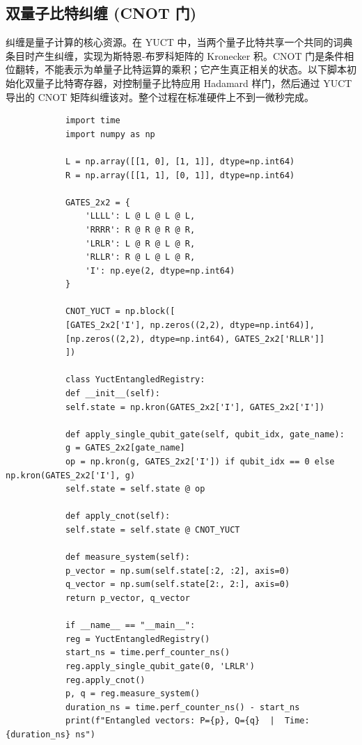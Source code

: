 \documentclass[11pt,a4paper]{article}
\begin{document}
	\subsection{双量子比特纠缠 (CNOT 门)}
	
	纠缠是量子计算的核心资源。在 YUCT 中，当两个量子比特共享一个共同的词典条目时产生纠缠，实现为斯特恩-布罗科矩阵的 Kronecker 积。CNOT 门是条件相位翻转，不能表示为单量子比特运算的乘积；它产生真正相关的状态。以下脚本初始化双量子比特寄存器，对控制量子比特应用 Hadamard 样门，然后通过 YUCT 导出的 CNOT 矩阵纠缠该对。整个过程在标准硬件上不到一微秒完成。
	
	\begin{tcolorbox}[title=YUCT CNOT 纠缠模拟器 (Python), breakable]
		\begin{lstlisting}
			import time
			import numpy as np
			
			L = np.array([[1, 0], [1, 1]], dtype=np.int64)
			R = np.array([[1, 1], [0, 1]], dtype=np.int64)
			
			GATES_2x2 = {
				'LLLL': L @ L @ L @ L,
				'RRRR': R @ R @ R @ R,
				'LRLR': L @ R @ L @ R,
				'RLLR': R @ L @ L @ R,
				'I': np.eye(2, dtype=np.int64)
			}
			
			CNOT_YUCT = np.block([
			[GATES_2x2['I'], np.zeros((2,2), dtype=np.int64)],
			[np.zeros((2,2), dtype=np.int64), GATES_2x2['RLLR']]
			])
			
			class YuctEntangledRegistry:
			def __init__(self):
			self.state = np.kron(GATES_2x2['I'], GATES_2x2['I'])
			
			def apply_single_qubit_gate(self, qubit_idx, gate_name):
			g = GATES_2x2[gate_name]
			op = np.kron(g, GATES_2x2['I']) if qubit_idx == 0 else np.kron(GATES_2x2['I'], g)
			self.state = self.state @ op
			
			def apply_cnot(self):
			self.state = self.state @ CNOT_YUCT
			
			def measure_system(self):
			p_vector = np.sum(self.state[:2, :2], axis=0)
			q_vector = np.sum(self.state[2:, 2:], axis=0)
			return p_vector, q_vector
			
			if __name__ == "__main__":
			reg = YuctEntangledRegistry()
			start_ns = time.perf_counter_ns()
			reg.apply_single_qubit_gate(0, 'LRLR')
			reg.apply_cnot()
			p, q = reg.measure_system()
			duration_ns = time.perf_counter_ns() - start_ns
			print(f"Entangled vectors: P={p}, Q={q}  |  Time: {duration_ns} ns")
		\end{lstlisting}
	\end{tcolorbox}
	
\end{document}
